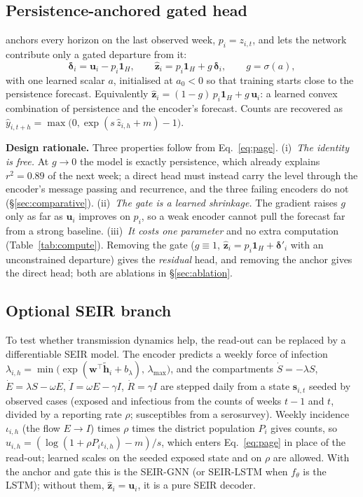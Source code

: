\subsection{Persistence-anchored gated head}
\label{sec:page}
\model{} anchors every horizon on the last observed week, $p_i=z_{i,t}$, and lets the
network contribute only a gated departure from it:
\begin{equation}
  \boldsymbol{\delta}_i=\mathbf{u}_i-p_i\mathbf{1}_H,\qquad
  \hat{\mathbf{z}}_i=p_i\mathbf{1}_H+g\,\boldsymbol{\delta}_i,\qquad g=\sigma(a),
  \label{eq:page}
\end{equation}
with one learned scalar $a$, initialised at $a_0<0$ so that training starts close to
the persistence forecast. Equivalently
$\hat{\mathbf{z}}_i=(1-g)\,p_i\mathbf{1}_H+g\,\mathbf{u}_i$: a learned convex
combination of persistence and the encoder's forecast. Counts are recovered as
$\hat y_{i,t+h}=\max\!\big(0,\exp(s\,\hat z_{i,h}+m)-1\big)$.

\textbf{Design rationale.} Three properties follow from Eq.~\eqref{eq:page}.
(i)~\emph{The identity is free.} At $g\to0$ the model is exactly persistence, which
already explains $r^2=0.89$ of the next week; a direct head must instead carry the
level through the encoder's message passing and recurrence, and the three failing
encoders do not (\S\ref{sec:comparative}). (ii)~\emph{The gate is a learned
shrinkage.} The gradient raises $g$ only as far as $\mathbf{u}_i$ improves on $p_i$,
so a weak encoder cannot pull the forecast far from a strong baseline. (iii)~\emph{It
costs one parameter} and no extra computation (Table~\ref{tab:compute}). Removing the
gate ($g\equiv1$, $\hat{\mathbf{z}}_i=p_i\mathbf{1}_H+\boldsymbol{\delta}'_i$ with an
unconstrained departure) gives the \emph{residual} head, and removing the anchor gives
the direct head; both are ablations in \S\ref{sec:ablation}.

\subsection{Optional SEIR branch}
\label{sec:seirbranch}
To test whether transmission dynamics help, the read-out can be replaced by a
differentiable SEIR model. The encoder predicts a weekly force of infection
$\lambda_{i,h}=\min\!\big(\exp(\mathbf{w}^{\top}\tilde{\mathbf{h}}_i+b_\lambda),\,
\lambda_{\max}\big)$, and the compartments
$\dot S=-\lambda S$, $\dot E=\lambda S-\omega E$, $\dot I=\omega E-\gamma I$,
$\dot R=\gamma I$ are stepped daily from a state $\mathbf{s}_{i,t}$ seeded by observed
cases (exposed and infectious from the counts of weeks $t-1$ and $t$, divided by a
reporting rate $\rho$; susceptibles from a serosurvey). Weekly incidence $\iota_{i,h}$ (the flow $E\to I$) times $\rho$ times the
district population $P_i$ gives counts, so
$u_{i,h}=(\log(1+\rho P_i\iota_{i,h})-m)/s$, which enters Eq.~\eqref{eq:page} in place
of the read-out; learned scales on the seeded exposed state and on $\rho$ are allowed.
With the anchor and gate this is the SEIR-GNN (or SEIR-LSTM when $f_\theta$ is the
LSTM); without them, $\hat{\mathbf{z}}_i=\mathbf{u}_i$, it is a pure SEIR decoder.

